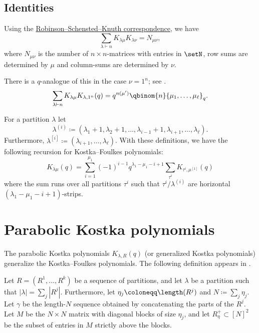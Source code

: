 
\subsection[kostkaIdentities]{Identities}

Using the \hyperref[rsk]{Robinson--Schensted--Knuth correspondence}, we have
\[
\sum_{\lambda \vdash n}  K_{\lambda \mu} K_{\lambda \nu} = N_{\mu\nu},
\]
where $N_{\mu\nu}$ is the number of $n \times n$-matrices with entries in $\setN$,
row sums are determined by $\mu$ and column-sums are determined by $\nu$.

There is a $q$-analogue of this in the case $\nu=1^n$; see
\cite[Corollary~1.3]{Kirillov2000}.
\[
\sum_{\lambda \vdash n}  K_{\lambda \mu} K_{\lambda, 1^n}(q) = q^{n(\mu')} \qbinom{n}{\mu_1,\dotsc,\mu_\ell}_q.
\]


\begin{theorem}
For a partition $\lambda$ let 
\[
\lambda^{(i)} \coloneqq (\lambda_1+1,\lambda_2+1,\dotsc,\lambda_{i-1}+1,\lambda_{i+1},\dotsc,\lambda_{\ell}).
\]
Furthermore, $\lambda^{[i]}\coloneqq (\lambda_{i+1},\dotsc,\lambda_\ell)$.
With these definitions, we have the following recursion for Kostka--Foulkes polynomials:
\[
K_{\lambda\mu}(q) = \sum_{i=1}^{\mu_1} (-1)^{i-1} q^{\lambda_1-\mu_1-i+1} \sum_{\tau^i} K_{\tau^i,\mu^{[1]}}(q)
\]
where the sum runs over all partitions $\tau^i$ such 
that $\tau^i/\lambda^{(i)}$ are horizontal $(\lambda_1-\mu_1-i+1)$-strips.
\end{theorem}

 
\section[kostkaFoulkesParabolic]{Parabolic Kostka polynomials}

The parabolic Kostka polynomials $K_{\lambda,R}(q)$ 
(or generalized Kostka polynomials) generalize the Kostka--Foulkes polynomials.
The following definition appears in \cite{ShimozonoWeyman2000}.

Let $R = (R^1,\dotsc,R^k)$ be a sequence of partitions,
and let $\lambda$ be a partition such that $|\lambda| = \sum_j |R^j|$.
Furthermore, let $\eta_j \coloneqq \length(R^j)$ and $N \coloneqq \sum_j \eta_j$.
Let $\gamma$ be the length-$N$ sequence obtained by concatenating the parts of
the $R^j$.
Let $M$ be the $N\times N$ matrix with diagonal blocks of size $\eta_j$,
and let $R^+_\eta \subset [N]^2$ be the subset of entries in $M$ strictly above the blocks.


